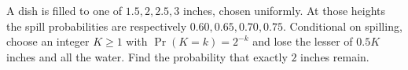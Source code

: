A dish is filled to one of $1.5,2,2.5,3$ inches, chosen uniformly. At those heights the spill probabilities are respectively $0.60,0.65,0.70,0.75$. Conditional on spilling, choose an integer $K\ge1$ with $\Pr(K=k)=2^{-k}$ and lose the lesser of $0.5K$ inches and all the water. Find the probability that exactly $2$ inches remain.
